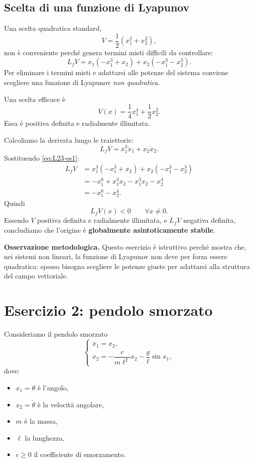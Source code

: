 \subsection{Scelta di una funzione di Lyapunov}

Una scelta quadratica standard,
\[
V=\frac{1}{2}(x_1^2+x_2^2),
\]
non è conveniente perché genera termini misti difficili da controllare:
\[
L_fV=x_1(-x_1^3+x_2)+x_2(-x_1^3-x_2^3).
\]
Per eliminare i termini misti e adattarsi alle potenze del sistema conviene scegliere una funzione di Lyapunov \emph{non quadratica}.

Una scelta efficace è
\[
V(x)=\frac{1}{4}x_1^4+\frac{1}{2}x_2^2.
\]
Essa è positiva definita e radialmente illimitata.

Calcoliamo la derivata lungo le traiettorie:
\[
L_fV = x_1^3\dot x_1 + x_2\dot x_2.
\]
Sostituendo \eqref{eq:L23-es1}:
\begin{align*}
L_fV
&= x_1^3(-x_1^3+x_2)+x_2(-x_1^3-x_2^3)\\
&= -x_1^6 + x_1^3x_2 - x_1^3x_2 - x_2^4\\
&= -x_1^6 - x_2^4.
\end{align*}
Quindi
\[
L_fV(x)<0
\qquad \forall x\neq 0.
\]
Essendo \(V\) positiva definita e radialmente illimitata, e \(L_fV\) negativa definita, concludiamo che l'origine è \textbf{globalmente asintoticamente stabile}.

\medskip

\noindent
\textbf{Osservazione metodologica.}
Questo esercizio è istruttivo perché mostra che, nei sistemi non lineari, la funzione di Lyapunov non deve per forza essere quadratica: spesso bisogna scegliere le potenze giuste per adattarsi alla struttura del campo vettoriale.

\section{Esercizio 2: pendolo smorzato}
\label{sec:L23-pendolo}

Consideriamo il pendolo smorzato
\begin{equation}
\label{eq:L23-pendolo}
\begin{cases}
\dot x_1 = x_2,\\[4pt]
\dot x_2 = -\dfrac{c}{m\ell^2}x_2 - \dfrac{g}{\ell}\sin x_1,
\end{cases}
\end{equation}
dove:
\begin{itemize}
    \item \(x_1=\theta\) è l'angolo,
    \item \(x_2=\dot\theta\) è la velocità angolare,
    \item \(m\) è la massa,
    \item \(\ell\) la lunghezza,
    \item \(c\ge 0\) il coefficiente di smorzamento.
\end{itemize}

